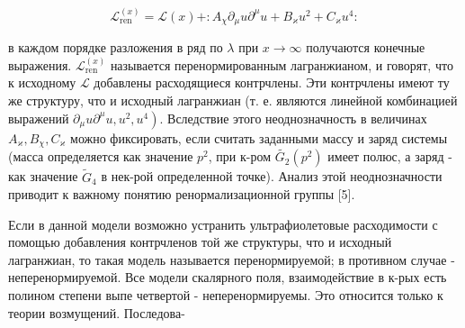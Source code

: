 \documentclass[10pt]{article}
\begin{document}
\[

\mathscr{L}_{\text {ren }}^{(x)}=\mathscr{L}(x)+: A_{\chi} \partial_{\mu} u \partial^{\mu} u+B_{\varkappa} u^{2}+C_{\varkappa} u^{4}:

\]



в каждом порядке разложения в ряд по $\lambda$ при $x \rightarrow \infty$ получаются конечные выражения. $\mathscr{L}_{\text {ren }}^{(x)}$ называется перенормированным лагранжианом, и говорят, что к исходному $\mathscr{L}$ добавлены расходящиеся контрчлены. Эти контрчлены имеют ту же структуру, что и исходный лагранжиан (т. е. являются линейной комбинацией выражений $\left.\partial_{\mu} u \partial^{\mu} u, u^{2}, u^{4}\right)$. Вследствие этого неоднозначность в величинах $A_{\varkappa}, B_{\chi}, C_{\varkappa}$ можно фиксировать, если считать заданными массу и заряд системы (масса определяется как значение $p^{2}$, при к-ром $\tilde{G_{2}}\left(p^{2}\right)$ имеет полюс, а заряд - как значение $\tilde{G}_{4}$ в нек-рой определенной точке). Анализ этой неоднозначности приводит к важному понятию ренормализационной группы [5].



Если в данной модели возможно устранить ультрафиолетовые расходимости с помощью добавления контрчленов той же структуры, что и исходный лагранжиан, то такая модель называется перенормируемой; в противном случае - неперенормируемой. Все модели скалярного поля, взаимодействие в к-рых есть полином степени выпе четвертой - неперенормируемы. Это относится только к теории возмущений. Последова-
\end{document}
